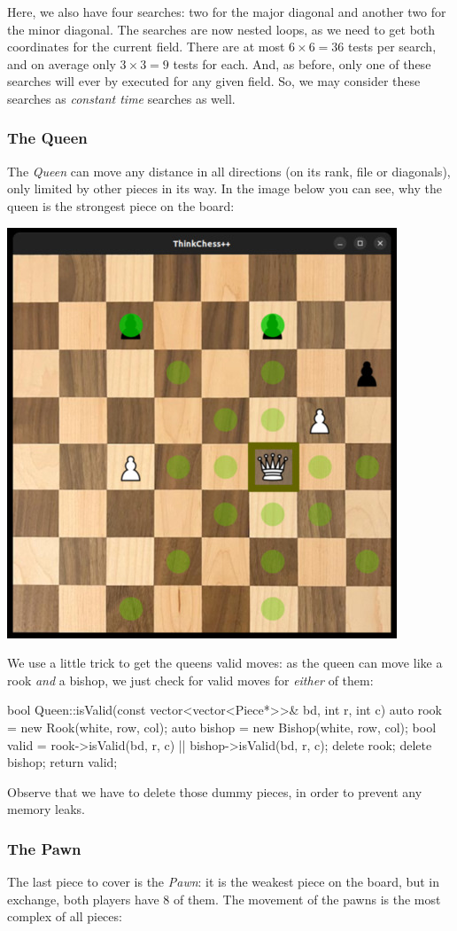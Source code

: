 Here, we also have four searches: two for the major diagonal and another two for the minor
diagonal.
The searches are now nested loops, as we need to get both coordinates for the current field.
There are at most $6 \times 6 = 36$ tests per search, and on average only $3 \times 3 = 9$
tests for each.
And, as before, only one of these searches will ever by executed for any given field.
So, we may consider these searches as \emph{constant time} searches as well.

\subsubsection{The Queen}
The \emph{Queen} can move any distance in all directions (on its rank, file or diagonals),
only limited by other pieces in its way.
In the image below you can see, why the queen is the strongest piece on the board:

\begin{center}
\includegraphics[width=.5\linewidth]{img/queen.jpg}
\end{center}

We use a little trick to get the queens valid moves: as the queen can move like a rook
\emph{and} a bishop, we just check for valid moves for \emph{either} of them:

\begin{cpp}
bool Queen::isValid(const vector<vector<Piece*>>& bd, int r, int c) {
  auto rook = new Rook(white, row, col);
  auto bishop = new Bishop(white, row, col);
  bool valid = rook->isValid(bd, r, c) || bishop->isValid(bd, r, c);
  delete rook;
  delete bishop;
  return valid;
}
\end{cpp}

Observe that we have to delete those dummy pieces, in order to prevent any memory leaks.

\subsubsection{The Pawn}
The last piece to cover is the \emph{Pawn}: it is the weakest piece on the board, but in
exchange, both players have 8 of them.
The movement of the pawns is the most complex of all pieces:

